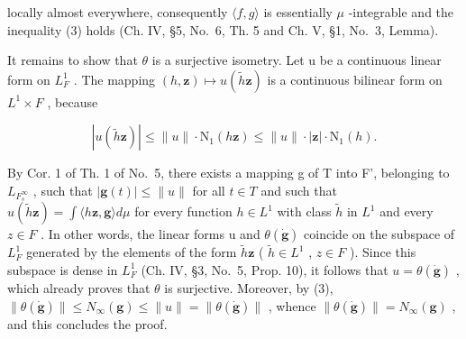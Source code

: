 locally almost everywhere, consequently \(\langle f,g\rangle\) is essentially \(\mu\) -integrable and the inequality (3) holds (Ch. IV, §5, No.~6, Th. 5 and Ch. V, §1, No.~3, Lemma).

It remains to show that \(\theta\) is a surjective isometry. Let u be a continuous linear form on \(L_{F}^{1}\) . The mapping \((h,\mathbf{z})\mapsto u(\widetilde{h}\mathbf{z})\) is a continuous bilinear form on \(L^{1}\times F\) , because

\[
\left| u \left(\widetilde {h} \mathbf {z}\right) \right| \leqslant \| u \| \cdot \mathrm{N} _ {1} (h \mathbf {z}) \leqslant \| u \| \cdot | \mathbf {z} | \cdot \mathrm{N} _ {1} (h).
\]

By Cor. 1 of Th. 1 of No.~5, there exists a mapping g of T into F', belonging to \(L_{F_{s}^{\infty}}\) , such that \(|\mathbf{g}(t)| \leqslant \|u\|\) for all \(t \in T\) and such that \(u(\widetilde{h}\mathbf{z}) = \int \langle h\mathbf{z}, \mathbf{g} \rangle d\mu\) for every function \(h \in L^{1}\) with class \(\widetilde{h}\) in \(L^{1}\) and every \(z \in F\) . In other words, the linear forms u and \(\theta(\dot{\mathbf{g}})\) coincide on the subspace of \(L_{F}^{1}\) generated by the elements of the form \(\widetilde{h}\mathbf{z}\) ( \(\widetilde{h} \in L^{1}\) , \(z \in F\) ). Since this subspace is dense in \(L_{F}^{1}\) (Ch. IV, §3, No.~5, Prop. 10), it follows that \(u = \theta(\dot{\mathbf{g}})\) , which already proves that \(\theta\) is surjective. Moreover, by (3), \(\|\theta(\dot{\mathbf{g}})\| \leqslant N_{\infty}(\mathbf{g}) \leqslant \|u\| = \|\theta(\dot{\mathbf{g}})\|\) , whence \(\|\theta(\dot{\mathbf{g}})\| = N_{\infty}(\mathbf{g})\) , and this concludes the proof.
\relax{}
